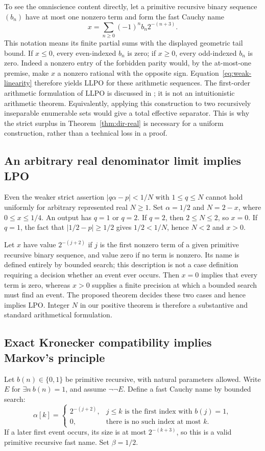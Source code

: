 \documentclass[11pt]{article}
\theoremstyle{definition}\newtheorem{definition}[theorem]{Definition}
\theoremstyle{remark}\newtheorem{remark}[theorem]{Remark}
\begin{document}
To see the omniscience content directly, let a primitive recursive binary sequence $(b_n)$ have at most one nonzero term and form the fast Cauchy name
\[
 x=\sum_{n\ge0}(-1)^n b_n2^{-(n+3)}.
\]
This notation means its finite partial sums with the displayed geometric tail bound. If $x\le0$, every even-indexed $b_n$ is zero; if $x\ge0$, every odd-indexed $b_n$ is zero. Indeed a nonzero entry of the forbidden parity would, by the at-most-one premise, make $x$ a nonzero rational with the opposite sign. Equation~\eqref{eq:weak-linearity} therefore yields LLPO for these arithmetic sequences. The first-order arithmetic formulation of LLPO is discussed in \cite{berardi-steila}; it is not an intuitionistic arithmetic theorem. Equivalently, applying this construction to two recursively inseparable enumerable sets would give a total effective separator. This is why the strict surplus in Theorem~\ref{thm:dir-real} is necessary for a uniform construction, rather than a technical loss in a proof.

\subsection{An arbitrary real denominator limit implies LPO}

Even the weaker strict assertion $|q\alpha-p|<1/N$ with $1\le q\le N$ cannot hold uniformly for arbitrary represented real $N\ge1$. Set $\alpha=1/2$ and $N=2-x$, where $0\le x\le1/4$. An output has $q=1$ or $q=2$. If $q=2$, then $2\le N\le2$, so $x=0$. If $q=1$, the fact that $|1/2-p|\ge1/2$ gives $1/2<1/N$, hence $N<2$ and $x>0$.

Let $x$ have value $2^{-(j+2)}$ if $j$ is the first nonzero term of a given primitive recursive binary sequence, and value zero if no term is nonzero. Its name is defined entirely by bounded search; this description is not a case definition requiring a decision whether an event ever occurs. Then $x=0$ implies that every term is zero, whereas $x>0$ supplies a finite precision at which a bounded search must find an event. The proposed theorem decides these two cases and hence implies LPO. Integer $N$ in our positive theorem is therefore a substantive and standard arithmetical formulation.

\subsection{Exact Kronecker compatibility implies Markov's principle}\label{sec:mp}

Let $b(n)\in\{0,1\}$ be primitive recursive, with natural parameters allowed. Write $E$ for $\exists n\ b(n)=1$, and assume $\neg\neg E$. Define a fast Cauchy name by bounded search:
\[
 \alpha[k]=
 \begin{cases}
 2^{-(j+2)},&j\le k\text{ is the first index with }b(j)=1,\\
 0,&\text{there is no such index at most }k.
 \end{cases}
\]
If a later first event occurs, its size is at most $2^{-(k+3)}$, so this is a valid primitive recursive fast name. Set $\beta=1/2$.
\end{document}
